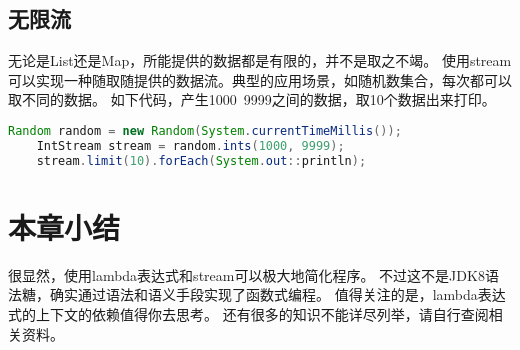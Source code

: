 \subsection{无限流}
无论是List还是Map，所能提供的数据都是有限的，并不是取之不竭。
使用stream可以实现一种随取随提供的数据流。典型的应用场景，如随机数集合，每次都可以取不同的数据。
如下代码，产生1000~9999之间的数据，取10个数据出来打印。

\begin{lstlisting}[language=Java]
	Random random = new Random(System.currentTimeMillis());
	IntStream stream = random.ints(1000, 9999);
	stream.limit(10).forEach(System.out::println);
\end{lstlisting}

\section{本章小结}
很显然，使用lambda表达式和stream可以极大地简化程序。
不过这不是JDK8语法糖，确实通过语法和语义手段实现了函数式编程。
值得关注的是，lambda表达式的上下文的依赖值得你去思考。
还有很多的知识不能详尽列举，请自行查阅相关资料。